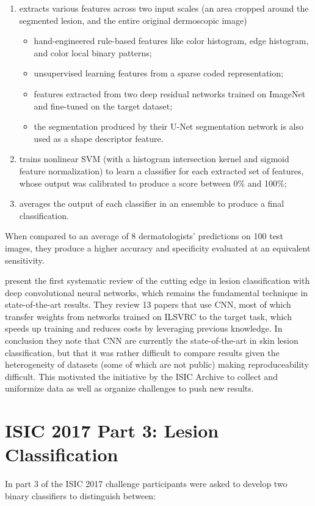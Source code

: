 \begin{enumerate}
    \item extracts various features across two input scales (an area cropped around the segmented lesion, and the entire original dermoscopic image)
    \begin{itemize}
        \item hand-engineered rule-based features like color histogram, edge histogram, and color local binary patterns;
        \item unsupervised learning features from a sparse coded representation;
        \item features extracted from two deep residual networks trained on ImageNet and fine-tuned on the target dataset;
        \item the segmentation produced by their U-Net segmentation network is also used as a shape descriptor feature.
    \end{itemize}
    \item trains nonlinear \ac{SVM} (with a histogram intersection kernel and sigmoid feature normalization) to learn a classifier for each extracted set of features, whose output was calibrated to produce a score between 0\% and 100\%;
    \item averages the output of each classifier in an ensemble to produce a final classification.
\end{enumerate}

When compared to an average of 8 dermatologists' predictions on 100 test images, they produce a higher accuracy and specificity evaluated at an equivalent sensitivity.

\citeauthor{Brinker2018} \cite{Brinker2018} present the first systematic review of the cutting edge in lesion classification with deep convolutional neural networks, which remains the fundamental technique in state-of-the-art results. They review 13 papers that use \ac{CNN}, most of which transfer weights from networks trained on \ac{ILSVRC} to the target task, which speeds up training and reduces costs by leveraging previous knowledge. In conclusion they note that \ac{CNN} are currently the state-of-the-art in skin lesion classification, but that it was rather difficult to compare results given the heterogeneity of datasets (some of which are not public) making reproduceability difficult. This motivated the initiative by the ISIC Archive to collect and uniformize data as well as organize challenges to push new results.

\section{ISIC 2017 Part 3: Lesion Classification}
In part 3 of the ISIC 2017 \cite{isic2017} challenge participants were asked to develop two binary classifiers to distinguish between:

